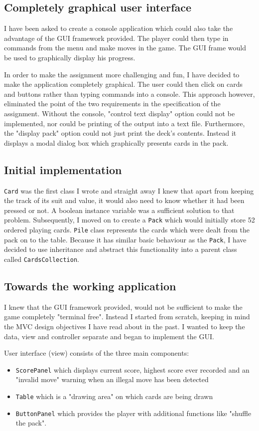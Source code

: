 \documentclass[a4paper, 11pt, titlepage]{article}
\begin{document}
\subsection{Completely graphical user interface}
I have been asked to create a console application which could also take the advantage of 
the GUI framework provided. The player could then type in commands from the menu and 
make moves in the game. The GUI frame would be used to graphically display his progress. 

In order to make the assignment more challenging and fun, I have decided to make the 
application completely graphical. The user could then click on cards and buttons rather than
typing commands into a console. This approach however, eliminated the point of the two 
requirements in the specification of the assignment. Without the console, "control text
display" option could not be implemented, nor could be printing of the output into a 
text file. Furthermore, the "display pack" option could not just print the deck's contents.
Instead it displays a modal dialog box which graphically presents cards in the pack.

\subsection{Initial implementation}
\texttt{Card} was the first class I wrote and straight away I knew that apart from 
keeping the track of its suit and value, it would also need to know whether it had been
pressed or not. A boolean instance variable was a sufficient solution to that problem. 
Subsequently, I moved on to create a \texttt{Pack} which would initially store 52 ordered
playing cards. \texttt{Pile} class represents the cards which were dealt from the pack
on to the table. Because it has similar basic behaviour as the \texttt{Pack}, I have
decided to use inheritance and abstract this functionality into a parent class called
\texttt{CardsCollection}. 

\subsection{Towards the working application}
I knew that the GUI framework provided, would not be sufficient to make the game 
completely "terminal free". Instead I started from scratch, keeping in mind the MVC 
design objectives I have read about in the past. I wanted to keep the data, view and 
controller separate and began to implement the GUI. 

User interface (view) consists of the three main components:
\begin{itemize}
	\item \texttt{ScorePanel} which displays current score, highest score ever recorded
		and an "invalid move" warning when an illegal move has been detected
	
	\item \texttt{Table} which is a "drawing area" on which cards are being drawn
	
	\item \texttt{ButtonPanel} which provides the player with additional functions like
		"shuffle the pack". 
\end{itemize}
\end{document}
